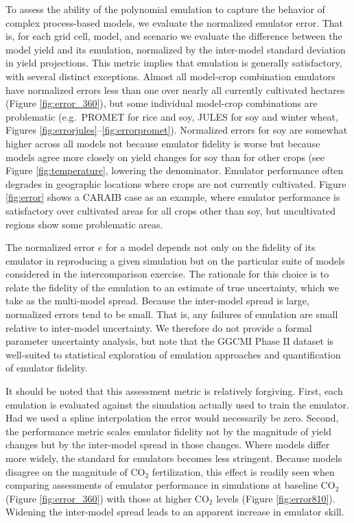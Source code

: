 \documentclass[preprint, 5p, times, twocolumn]{elsarticle}
\begin{document}
To assess the ability of the polynomial emulation to capture the behavior of complex process-based models, we evaluate the normalized emulator error. That is, for each grid cell, model, and scenario we evaluate the difference between the model yield and its emulation, normalized by the inter-model standard deviation in yield projections. This metric implies that emulation is generally satisfactory, with several distinct exceptions. Almost all model-crop combination emulators have normalized errors less than one over nearly all currently cultivated hectares (Figure \ref{fig:error_360}), but some individual model-crop combinations are problematic (e.g.\ PROMET for rice and soy, JULES for soy and winter wheat, Figures \ref{fig:errorjules}--\ref{fig:errorpromet}). Normalized errors for soy are somewhat higher across all models not because emulator fidelity is worse but because models agree more closely on yield changes for soy than for other crops (see Figure \ref{fig:temperature}, lowering the denominator. Emulator performance often degrades in geographic locations where crops are not currently cultivated. Figure \ref{fig:error} shows a CARAIB case as an example, where emulator performance is satisfactory over cultivated areas for all crops other than soy, but uncultivated regions show some problematic areas. 

The normalized error $e$ for a model depends not only on the fidelity of its emulator in reproducing a given simulation but on the particular suite of models considered in the intercomparison exercise. The rationale for this choice is to relate the fidelity of the emulation to an estimate of true uncertainty, which we take as the multi-model spread. Because the inter-model spread is large, normalized errors tend to be small. That is, any failures of emulation are small relative to inter-model uncertainty. We therefore do not provide a formal parameter uncertainty analysis, but note that the GGCMI Phase II dataset is well-suited to statistical exploration of emulation approaches and quantification of emulator fidelity.

It should be noted that this assessment metric is relatively forgiving. First, each emulation is evaluated against the simulation actually used to train the emulator. Had we used a spline interpolation the error would necessarily be zero. Second, the performance metric scales emulator fidelity not by the magnitude of yield changes but by the inter-model spread in those changes. Where models differ more widely, the standard for emulators becomes less stringent. Because models disagree on the magnitude of CO$_2$ fertilization, this effect is readily seen when comparing assessments of emulator performance in simulations at  baseline CO$_2$ (Figure \ref{fig:error_360}) with those at higher CO$_2$ levels (Figure \ref{fig:error810}). Widening the inter-model spread leads to an apparent increase in emulator skill.
\end{document}
